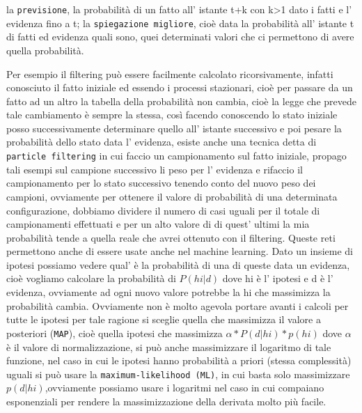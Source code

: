 		la \texttt{previsione}, la probabilità di un fatto all' istante t+k con k>1 dato i fatti e l' evidenza fino a t;
		la \texttt{spiegazione migliore}, cioè data la probabilità all' istante t di fatti ed evidenza quali sono, quei determinati valori che ci permettono di avere quella probabilità.
		\par 
		Per esempio il filtering può essere facilmente calcolato ricorsivamente, infatti conosciuto il fatto iniziale ed essendo i processi stazionari, cioè per passare da un fatto ad un altro la tabella della probabilità non cambia, cioè la legge che prevede tale cambiamento è sempre la stessa, così facendo conoscendo lo stato iniziale posso successivamente determinare quello all' istante successivo e poi pesare la probabilità dello stato data l' evidenza, esiste anche una tecnica detta di \texttt{particle filtering} in cui faccio un campionamento sul fatto iniziale, propago tali esempi sul campione successivo li peso per l' evidenza e rifaccio il campionamento per lo stato successivo tenendo conto del nuovo peso dei campioni, ovviamente per ottenere il valore di probabilità di una determinata configurazione, dobbiamo dividere il numero di casi uguali per il totale di campionamenti effettuati e per un alto valore di di quest' ultimi la mia probabilità tende a quella reale che avrei ottenuto con il filtering. Queste reti permettono anche di essere usate anche nel machine learning. Dato un insieme di ipotesi possiamo vedere qual' è la probabilità di una di queste data un evidenza, cioè vogliamo calcolare la probabilità di $P(hi|d)$ dove hi è l' ipotesi e d è l' evidenza, ovviamente ad ogni nuovo valore potrebbe la hi che massimizza la probabilità cambia. Ovviamente non è molto agevola portare avanti i calcoli per tutte le ipotesi per tale ragione si sceglie quella che massimizza il valore a posteriori (\texttt{MAP}), cioè quella ipotesi che massimizza $\alpha*P(d|hi)*p(hi)$ dove $\alpha$ è il valore di normalizzazione, si può anche massimizzare il logaritmo di tale funzione, nel caso in cui le ipotesi hanno probabilità a priori (stessa complessità) uguali si può usare la \texttt{maximum-likelihood (ML)}, in cui basta solo massimizzare $p(d|hi)$,ovviamente possiamo usare i logaritmi nel caso in cui compaiano esponenziali per rendere la massimizzazione della derivata molto più facile.
		
